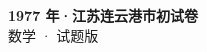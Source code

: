 \documentclass[zihao=-4, a4paper]{ctexart}
\begin{document}
\begin{center}
  {\Large\bfseries 1977 年·江苏连云港市初试卷}\\[4pt]
  {\large 数学 · 试题版}
\end{center}
\medskip
{}

\end{document}
